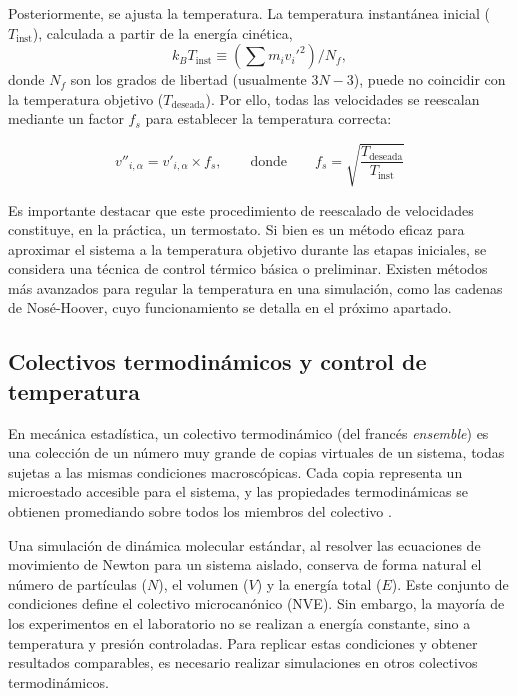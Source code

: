 Posteriormente, se ajusta la temperatura. La temperatura instantánea inicial ($T_{\text{inst}}$), calculada a partir de la energía cinética, 
\begin{equation}
    k_B T_{\text{inst}} \equiv (\sum m_i v_i'^2) / N_f, 
    \label{eq:temp_instantanea} 
\end{equation}
donde $N_f$ son los grados de libertad (usualmente $3N-3$), puede no coincidir con la temperatura objetivo ($T_{\text{deseada}}$). Por ello, todas las velocidades se reescalan mediante un factor $f_s$ para establecer la temperatura correcta:

\begin{equation}
    v''_{i, \alpha} = v'_{i, \alpha} \times f_s, \qquad \text{donde} \qquad f_s = \sqrt{\frac{T_{\text{deseada}}}{T_{\text{inst}}}}
    \label{eq:temp_scaling} %
\end{equation}

Es importante destacar que este procedimiento de reescalado de velocidades constituye, en la práctica, un termostato. Si bien es un método eficaz para aproximar el sistema a la temperatura objetivo durante las etapas iniciales, se considera una técnica de control térmico básica o preliminar. Existen métodos más avanzados para regular la temperatura en una simulación, como las cadenas de Nosé-Hoover, cuyo funcionamiento se detalla en el próximo apartado.

\subsection{Colectivos termodinámicos y control de temperatura}

En mecánica estadística, un colectivo termodinámico (del francés \textit{ensemble}) es una colección de un número muy grande de copias virtuales de un sistema, todas sujetas a las mismas condiciones macroscópicas. Cada copia representa un microestado accesible para el sistema, y las propiedades termodinámicas se obtienen promediando sobre todos los miembros del colectivo \cite{zhou2022molecular}.

Una simulación de dinámica molecular estándar, al resolver las ecuaciones de movimiento de Newton para un sistema aislado, conserva de forma natural el número de partículas ($N$), el volumen ($V$) y la energía total ($E$). Este conjunto de condiciones define el colectivo microcanónico (NVE). Sin embargo, la mayoría de los experimentos en el laboratorio no se realizan a energía constante, sino a temperatura y presión controladas. Para replicar estas condiciones y obtener resultados comparables, es necesario realizar simulaciones en otros colectivos termodinámicos.

